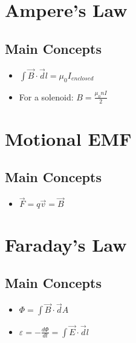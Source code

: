 \documentclass{article}
\begin{document}
\section{Ampere's Law}
\subsection{Main Concepts}
\begin{itemize}
	\item $\int \vec B \cdot \vec dl = \mu_0 I_{enclosed}$
	\item For a solenoid: $B = \frac{\mu_0nI}{2}$
\end{itemize}
\section{Motional EMF}
\subsection{Main Concepts}
\begin{itemize}
	\item $\vec F = q\vec v = \vec B$
\end{itemize}

\section{Faraday's Law}
\subsection{Main Concepts}
\begin{itemize}
	\item $\Phi = \int \vec B \cdot \vec dA$
	\item $\varepsilon = -\frac{d\Phi}{dt} = \int \vec E \cdot \vec dl$
\end{itemize}
\end{document}
